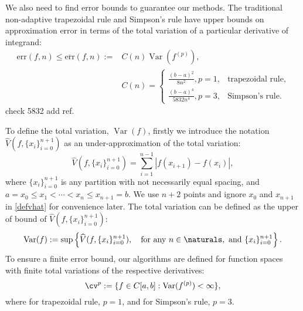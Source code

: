 \documentclass{iitthesis}
\DeclareMathOperator{\Var}{Var}
\theoremstyle{definition}
\theoremstyle{remark}
\begin{document}
We also need to find error bounds to guarantee our methods. The traditional non-adaptive trapezoidal rule and Simpson's rule have upper bounds on approximation error in terms of the total variation of a particular derivative of integrand:
\begin{align}\label{errorbound}
    \text{err}(f,n)\le\overline{\text{err}}(f,n):=&C(n)\Var(f^{(p)}),\\
    \nonumber&C(n)=
    \begin{cases*}
           \frac{(b-a)^2}{8n^2}, p=1,  & \mbox{trapezoidal rule}, \\
           \frac{(b-a)^4}{5832n^4}, p=3, & \mbox{Simpson's rule}.
    \end{cases*}
\end{align}
check 5832 add ref.

To define the total variation, $\Var(f)$, firstly we introduce the notation $\widehat{V}(f,\{x_i\}_{i=0}^{n+1})$ as an under-approximation of the total variation:
\begin{equation}\label{defvhat}
    \widehat{V}(f,\{x_i\}_{i=0}^{n+1})=\sum_{i=1}^{n-1}|f(x_{i+1})-f(x_{i})|,
\end{equation}
where $\{x_i\}_{i=0}^{n+1}$ is any partition with not necessarily equal spacing, and $a=x_{0}\leq x_{1}<\cdots<x_{n}\leq x_{n+1}=b$.
We use $n+2$ points and ignore $x_0$ and $x_{n+1}$ in \eqref{defvhat} for convenience later.
The total variation can be defined as the upper of bound of $\widehat{V}(f,\{x_i\}_{i=0}^{n+1})$:
\begin{equation}\label{defvar}
  \Var(f) := \sup \left\{\widehat{V}(f,\{x_i\}_{i=0}^{n+1}), \quad \text{for any }n \in \naturals, \text{ and } \{x_i\}_{i=0}^{n+1}\right\}.
\end{equation}
To ensure a finite error bound, our algorithms are defined for function spaces with finite total variations of the respective derivatives:
\begin{equation}\label{defspace}
 \cv^{p}:=\{f\in C[a,b]: \Var(f^{(p)}) < \infty \},
\end{equation}
where for trapezoidal rule, $p=1$, and for Simpson's rule, $p=3$.
\end{document}
